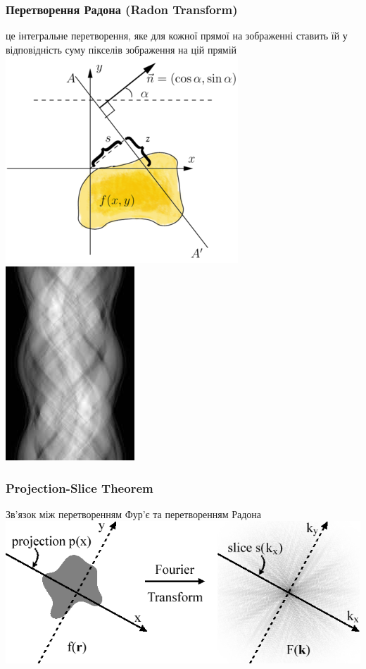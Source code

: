 \documentclass[12pt]{beamer}
\begin{document}
\begin{frame}\frametitle{Перетворення Радона (Radon Transform) }
	це інтегральне перетворення, яке для кожної прямої на зображенні ставить їй у відповідність суму пікселів зображення на цій прямій\linebreak
	\includegraphics[scale=0.4]{images/radon} \texttt{}
	\includegraphics[scale=0.4]{images/sinogram} 
\end{frame}

\begin{frame}\frametitle{Projection-Slice Theorem }
	Зв'язок між перетворенням Фур'є та перетворенням Радона \linebreak
	\includegraphics[scale=0.4]{images/projection_slice} 
\end{frame}
\end{document}

